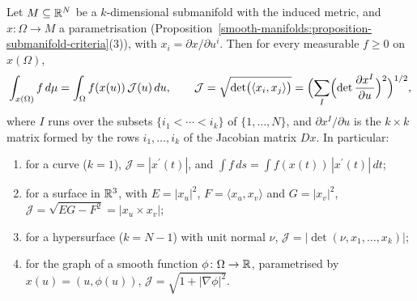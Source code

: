 \begin{proposition}\label{riemannian-geometry:proposition-parametrised-volume}
Let $M \subseteq \mathbb{R}^N$ be a $k$-dimensional submanifold with the induced metric, and $x \colon \Omega \to M$ a parametrisation
(Proposition~\ref{smooth-manifolds:proposition-submanifold-criteria}(3)), with $x_i = \partial x/\partial u^i$. Then for every measurable $f \geq 0$ on $x(\Omega)$,
\[
\int_{x(\Omega)}f\,d\mu = \int_\Omega f(x(u))\,\mathcal{J}(u)\,du, \qquad
\mathcal{J} = \sqrt{\det\bigl(\langle x_i, x_j\rangle\bigr)} = \Bigl(\sum_I\Bigl(\det\frac{\partial x^I}{\partial u}\Bigr)^2\Bigr)^{1/2},
\]
where $I$ runs over the subsets $\{i_1 < \cdots < i_k\}$ of $\{1, \ldots, N\}$, and $\partial x^I/\partial u$ is the $k \times k$ matrix formed by the rows
$i_1, \ldots, i_k$ of the Jacobian matrix $Dx$. In particular:
\begin{enumerate}
\item for a curve ($k = 1$), $\mathcal{J} = |x^{\prime}(t)|$, and $\int f\,ds = \int f(x(t))\,|x^{\prime}(t)|\,dt$;
\item for a surface in $\mathbb{R}^3$, with $E = |x_u|^2$, $F = \langle x_u, x_v\rangle$ and $G = |x_v|^2$, $\mathcal{J} = \sqrt{EG - F^2} = |x_u \times x_v|$;
\item for a hypersurface ($k = N - 1$) with unit normal $\nu$, $\mathcal{J} = |\det(\nu, x_1, \ldots, x_k)|$;
\item for the graph of a smooth function $\phi \colon \Omega \to \mathbb{R}$, parametrised by $x(u) = (u, \phi(u))$, $\mathcal{J} = \sqrt{1 + |\nabla\phi|^2}$.
\end{enumerate}
\end{proposition}

